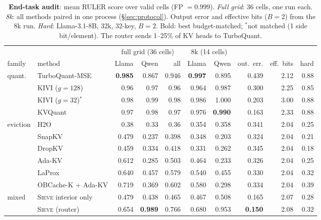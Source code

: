 \documentclass{article}
\newif\ifshowest \showesttrue
\DeclareRobustCommand{\est}[1]{\ifshowest{\color{estcol}#1}\else---\fi}
\DeclareRobustCommand{\estalt}[2]{\ifshowest#1\else#2\fi}
\newcommand{\sieve}{\textsc{Sieve}}
\theoremstyle{definition}
\begin{document}
\begin{table}[t]
\centering
\footnotesize
\setlength{\tabcolsep}{2.6pt}
\caption{\textbf{End-task audit}: mean RULER score over valid cells (FP $=0.999$). \emph{Full grid}: 36 cells, one run each. \emph{8k}: all methods paired in one process (\S\ref{sec:protocol}).
Output error and effective bits ($B=2$) from the 8k run. \emph{Hard}: Llama-3.1-8B, 32k, 32-key, $B=2$. Bold: best budget-matched; $^\ast$not matched (1 side bit/element). The router sends 1--25\% of KV heads to TurboQuant.
}
\label{tab:endtask}
\begin{tabular}{@{}llrrrrrrrr@{}}
\toprule
& & \multicolumn{3}{c}{full grid (36 cells)} & \multicolumn{2}{c}{8k (14 cells)} & & & \\
\cmidrule(lr){3-5}\cmidrule(lr){6-7}
family & method & Llama & Qwen & all & Llama & Qwen & out.\ err. & eff.\ bits & hard \\
\midrule
\multirow{4}{*}{quant.} & TurboQuant-MSE & \textbf{0.985} & 0.867 & 0.946 & \textbf{0.997} & 0.895 & 0.439 & 2.12 & \est{0.88} \\
 & KIVI ($g{=}128$) & \est{0.96} & \est{0.97} & \est{0.96} & 0.964 & 0.987 & 0.300 & 2.25 & \est{0.85} \\
 & KIVI ($g{=}32$)$^\ast$ & \est{0.98} & \est{0.99} & \est{0.98} & 0.986 & 1.000 & 0.203 & 3.00 & \est{0.88} \\
 & KVQuant & \est{0.97} & \est{0.98} & \est{0.97} & 0.976 & \textbf{0.990} & 0.163 & 2.33 & \est{0.88} \\
\midrule
\multirow{6}{*}{eviction} & H2O & \est{0.38} & \est{0.33} & \est{0.36} & 0.354 & 0.358 & 0.341 & 2.04 & \est{0.25} \\
 & SnapKV & 0.479 & 0.237 & 0.398 & 0.348 & 0.203 & 0.324 & 2.04 & \est{0.21} \\
 & DropKV & 0.459 & 0.334 & 0.418 & 0.331 & 0.262 & 0.345 & 2.04 & \est{0.18} \\
 & Ada-KV & 0.612 & 0.285 & 0.503 & 0.464 & 0.233 & 0.326 & 2.04 & \est{0.25} \\
 & LaProx & 0.640 & 0.457 & 0.579 & 0.540 & 0.455 & 0.330 & 2.04 & \est{0.32} \\
 & OBCache-K + Ada-KV & 0.719 & 0.369 & 0.602 & 0.580 & 0.298 & 0.334 & 2.04 & \est{0.39} \\
\midrule
\multirow{2}{*}{mixed} & \sieve{} interior only & 0.479 & 0.438 & 0.465 & 0.467 & 0.508 & 0.165 & 2.07 & \est{0.28} \\
 & \sieve{} (router) & 0.654 & \textbf{0.989} & 0.766 & 0.680 & 0.953 & \textbf{0.150} & 2.08 & \est{0.32} \\
\bottomrule
\end{tabular}
\vspace{-2mm}
\end{table}
\end{document}
